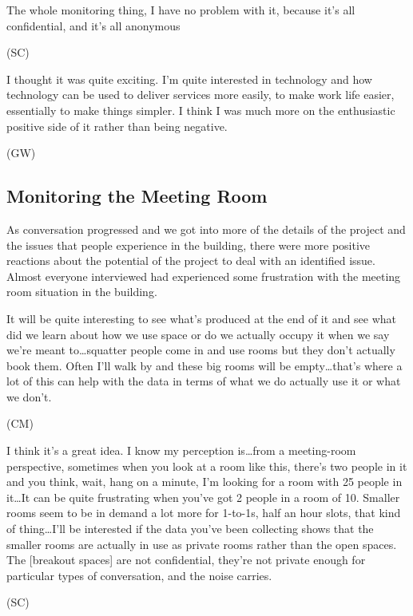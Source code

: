 \begin{qt}The whole monitoring thing, I have no problem with it, because it’s
all confidential, and it’s all anonymous\end{qt} (SC)

\begin{qt}I thought it was quite exciting. I’m quite interested in technology
and how technology can be used to deliver services more easily, to
make work life easier, essentially to make things simpler. I think I
was much more on the enthusiastic positive side of it rather than
being negative.\end{qt} (GW)

\subsection{Monitoring the Meeting Room}

As conversation progressed and we got into more of the details of the
project and the issues that people experience in the building, there
were more positive reactions about the potential of the project to
deal with an identified issue. Almost everyone interviewed had
experienced some frustration with the meeting room situation in the
building.

\begin{qt}It will be quite interesting to see what’s produced at the end of it
and see what did we learn about how we use space or do we actually
occupy it when we say we’re meant to\ldots squatter people come in and use
rooms but they don’t actually book them. Often I’ll walk by and these
big rooms will be empty\ldots that’s where a lot of this can help with the
data in terms of what we do actually use it or what we don’t.\end{qt} (CM)

\begin{qt}I think it’s a great idea. I know my perception is\ldots from a
meeting-room perspective, sometimes when you look at a room like this,
there’s two people in it and you think, wait, hang on a minute, I’m
looking for a room with 25 people in it\ldots It can be quite frustrating
when you’ve got 2 people in a room of 10. Smaller rooms seem to be in
demand a lot more for 1-to-1s, half an hour slots, that kind of
thing\ldots I’ll be interested if the data you’ve been collecting shows that
the smaller rooms are actually in use as private rooms rather than the
open spaces. The [breakout spaces] are not confidential, they’re not
private enough for particular types of conversation, and the noise
carries.\end{qt} (SC)

